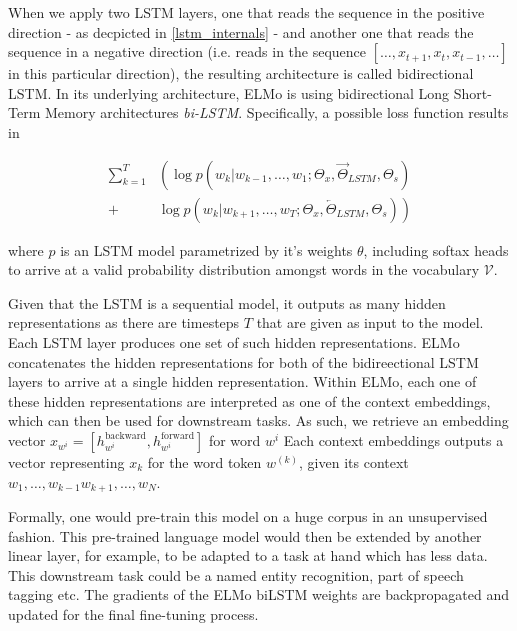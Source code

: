 \documentclass[a4paper,12pt,twoside,openright]{report}
\begin{document}
When we apply two LSTM layers, one that reads the sequence in the positive direction - as decpicted in \eqref{lstm_internals} - and another one that reads the sequence in a negative direction (i.e. reads in the sequence $[\ldots, x_{t+1}, x_t, x_{t-1}, \ldots]$ in this particular direction), the resulting architecture is called bidirectional LSTM.
In its underlying architecture, ELMo is using bidirectional Long Short-Term Memory architectures \textit{bi-LSTM}.
Specifically, a possible loss function results in 

\begin{align} 
\sum_{k=1}^{T} &\left(\log p\left(w_{k} | w_{k-1}, \ldots, w_{1} ; \Theta_{x}, \vec{\Theta}_{L S T M}, \Theta_{s}\right)\right.\\
+&\left.\log p\left(w_{k} | w_{k+1}, \ldots, w_{T}; \Theta_{x}, \overleftarrow{\Theta}_{L S T M}, \Theta_{s}\right)\right) 
\end{align}

where $p$ is an LSTM model parametrized by it's weights $\theta$, including softax heads to arrive at a valid probability distribution amongst words in the vocabulary $\mathcal{V}$.

Given that the LSTM is a sequential model, it outputs as many hidden representations as there are timesteps $T$ that are given as input to the model. 
Each LSTM layer produces one set of such hidden representations.
ELMo concatenates the hidden representations for both of the bidireectional LSTM layers to arrive at a single hidden representation.
Within ELMo, each one of these hidden representations are interpreted as one of the context embeddings, which can then be used for downstream tasks.
As such, we retrieve an embedding vector $x_{w^i} = [h^\text{backward}_{w^i}, h^\text{forward}_{w^i}]$ for word $w^i$
Each context embeddings outputs a vector representing $x_{k}$ for the word token $w^{(k)}$, given its context $ w_{1}, \ldots, w_{k-1}  w_{k+1}, \ldots, w_{N}$.


Formally, one would pre-train this model on a huge corpus in an unsupervised fashion.
This pre-trained language model would then be extended by another linear layer, for example, to be adapted to a task at hand which has less data.
This downstream task could be a named entity recognition, part of speech tagging etc.
The gradients of the ELMo biLSTM weights are backpropagated and updated for the final fine-tuning process.

\end{document}
